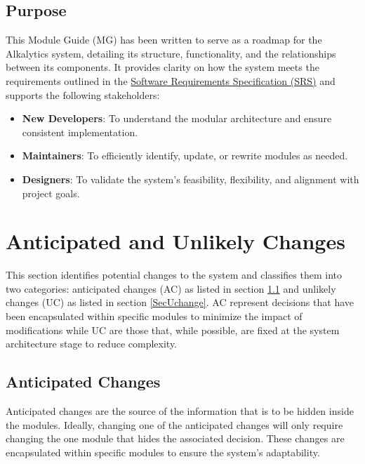 \documentclass[12pt, titlepage]{article}
\begin{document}
\subsection{Purpose}
This Module Guide (MG) has been written to serve as a roadmap for the Alkalytics system,
detailing its structure, functionality, and the relationships between its components.
It provides clarity on how the system meets the requirements outlined in the 
\href{https://github.com/SumanyaG/Alkalytics/blob/main/docs/SRS/SRS.pdf}{Software Requirements Specification (SRS)}
and supports the following stakeholders:
\begin{itemize}
  \item \textbf{New Developers}: To understand the modular architecture and ensure
  consistent implementation.
  \item \textbf{Maintainers}: To efficiently identify, update, or rewrite modules as needed.
  \item \textbf{Designers}: To validate the system's feasibility, flexibility, and alignment
  with project goals. 
\end{itemize}

\section{Anticipated and Unlikely Changes} \label{SecChange}

This section identifies potential changes to the system and classifies them into
two categories: anticipated changes (AC) as listed in section \ref{SecAchange} and
unlikely changes (UC) as listed in section \ref{SecUchange}. AC represent decisions 
that have been encapsulated within specific modules to minimize the impact of 
modifications while UC are those that, while possible, are fixed at the system 
architecture stage to reduce complexity.

\subsection{Anticipated Changes} \label{SecAchange}

Anticipated changes are the source of the information that is to be hidden
inside the modules. Ideally, changing one of the anticipated changes will only
require changing the one module that hides the associated decision. These changes
are encapsulated within specific modules to ensure the system's adaptability.
\end{document}
